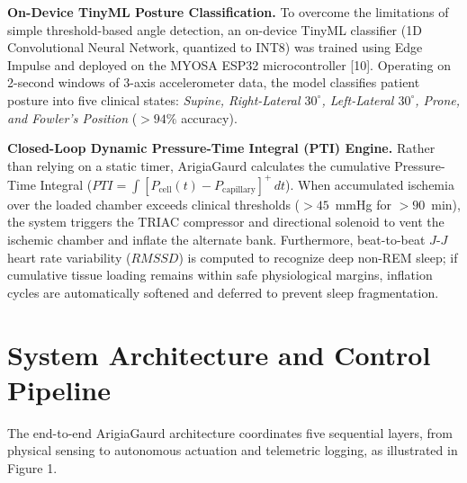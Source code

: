 ﻿\documentclass[11pt,a4paper]{article}
\begin{document}
\noindent \textbf{On-Device TinyML Posture Classification.} To overcome the limitations of simple threshold-based angle detection, an on-device TinyML classifier (1D Convolutional Neural Network, quantized to INT8) was trained using Edge Impulse and deployed on the MYOSA ESP32 microcontroller [10]. Operating on 2-second windows of 3-axis accelerometer data, the model classifies patient posture into five clinical states: \textit{Supine, Right-Lateral $30^\circ$, Left-Lateral $30^\circ$, Prone, and Fowler's Position} ($>94\%$ accuracy).

\noindent \textbf{Closed-Loop Dynamic Pressure-Time Integral (PTI) Engine.} Rather than relying on a static timer, ArigiaGaurd calculates the cumulative Pressure-Time Integral ($PTI = \int [P_{\text{cell}}(t) - P_{\text{capillary}}]^+ \, dt$). When accumulated ischemia over the loaded chamber exceeds clinical thresholds ($>45$~mmHg for $>90$~min), the system triggers the TRIAC compressor and directional solenoid to vent the ischemic chamber and inflate the alternate bank. Furthermore, beat-to-beat $J$-$J$ heart rate variability ($RMSSD$) is computed to recognize deep non-REM sleep; if cumulative tissue loading remains within safe physiological margins, inflation cycles are automatically softened and deferred to prevent sleep fragmentation.

\section{System Architecture and Control Pipeline}
The end-to-end ArigiaGaurd architecture coordinates five sequential layers, from physical sensing to autonomous actuation and telemetric logging, as illustrated in Figure 1.
\end{document}
